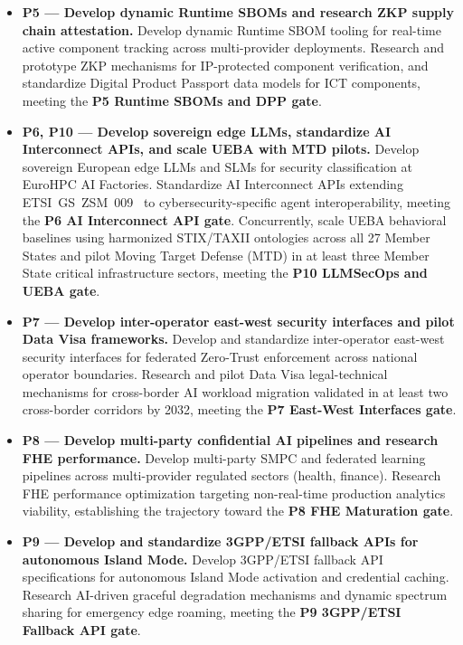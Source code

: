 \begin{itemize}
    \item \textbf{P5 --- Develop dynamic Runtime SBOMs and research
    ZKP supply chain attestation.}
    Develop dynamic Runtime SBOM tooling for real-time active component
    tracking across multi-provider deployments. Research and prototype
    ZKP mechanisms for IP-protected component verification, and
    standardize Digital Product Passport data models for ICT
    components, meeting the
    \textbf{P5 Runtime SBOMs and DPP gate}.

    \item \textbf{P6, P10 --- Develop sovereign edge LLMs, standardize
    AI Interconnect APIs, and scale UEBA with MTD pilots.}
    Develop sovereign European edge LLMs and SLMs for security
    classification at EuroHPC AI Factories. Standardize AI Interconnect
    APIs extending ETSI~GS~ZSM~009~\cite{etsi_zsm009} to
    cybersecurity-specific agent interoperability, meeting the
    \textbf{P6 AI Interconnect API gate}. Concurrently, scale UEBA
    behavioral baselines using harmonized STIX/TAXII ontologies across
    all 27 Member States and pilot Moving Target Defense (MTD) in at
    least three Member State critical infrastructure sectors, meeting
    the \textbf{P10 LLMSecOps and UEBA gate}.

    \item \textbf{P7 --- Develop inter-operator east-west security
    interfaces and pilot Data Visa frameworks.}
    Develop and standardize inter-operator east-west security
    interfaces for federated Zero-Trust enforcement across national
    operator boundaries. Research and pilot Data Visa legal-technical
    mechanisms for cross-border AI workload migration validated in at
    least two cross-border corridors by 2032, meeting the
    \textbf{P7 East-West Interfaces gate}.

    \item \textbf{P8 --- Develop multi-party confidential AI pipelines
    and research FHE performance.}
    Develop multi-party SMPC and federated learning pipelines across
    multi-provider regulated sectors (health, finance). Research FHE
    performance optimization targeting non-real-time production
    analytics viability, establishing the trajectory toward the
    \textbf{P8 FHE Maturation gate}.

    \item \textbf{P9 --- Develop and standardize 3GPP/ETSI fallback
    APIs for autonomous Island Mode.}
    Develop 3GPP/ETSI fallback API specifications for autonomous Island
    Mode activation and credential caching. Research AI-driven
    graceful degradation mechanisms and dynamic spectrum sharing for
    emergency edge roaming, meeting the
    \textbf{P9 3GPP/ETSI Fallback API gate}.

\end{itemize}

